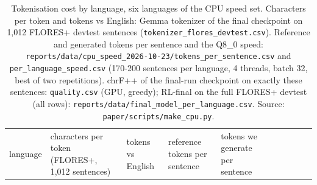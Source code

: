 \begin{table}[t]
\centering
\scriptsize
\setlength{\tabcolsep}{3pt}
\caption{Tokenisation cost by language, six languages of the CPU speed set. Characters per token and tokens vs English: Gemma tokenizer of the final checkpoint on 1,012 FLORES+ devtest sentences (\texttt{tokenizer\_flores\_devtest.csv}). Reference and generated tokens per sentence and the Q8\_0 speed: \texttt{reports/data/cpu\_speed\_2026-10-23/tokens\_per\_sentence.csv} and \texttt{per\_language\_speed.csv} (170-200 sentences per language, 4 threads, batch 32, best of two repetitions). chrF++ of the final-run checkpoint on exactly these sentences: \texttt{quality.csv} (GPU, greedy); RL-final on the full FLORES+ devtest (all rows): \texttt{reports/data/final\_model\_per\_language.csv}. Source: \texttt{paper/scripts/make\_cpu.py}.}
\label{tab:t_tokcost_lang}
{\def\LTcaptype{none} %
\begin{tabular}{@{}
  >{\raggedright\arraybackslash}p{}
  >{\raggedleft\arraybackslash}p{}
  >{\raggedleft\arraybackslash}p{}
  >{\raggedleft\arraybackslash}p{}
  >{\raggedleft\arraybackslash}p{}
  >{\raggedleft\arraybackslash}p{}
  >{\raggedleft\arraybackslash}p{}
  >{\raggedleft\arraybackslash}p{}
  >{\raggedleft\arraybackslash}p{}
  >{\raggedleft\arraybackslash}p{}@{}}
\toprule
\begin{minipage}[b]{\linewidth}\raggedright
language
\end{minipage} & \begin{minipage}[b]{\linewidth}\raggedleft
characters per token (FLORES+, 1,012 sentences)
\end{minipage} & \begin{minipage}[b]{\linewidth}\raggedleft
tokens vs English
\end{minipage} & \begin{minipage}[b]{\linewidth}\raggedleft
reference tokens per sentence
\end{minipage} & \begin{minipage}[b]{\linewidth}\raggedleft
tokens we generate per sentence
\end{minipage} & \begin{minipage}[b]{\linewidth}\raggedleft

\end{minipage}
\end{tabular}}
\end{table}
